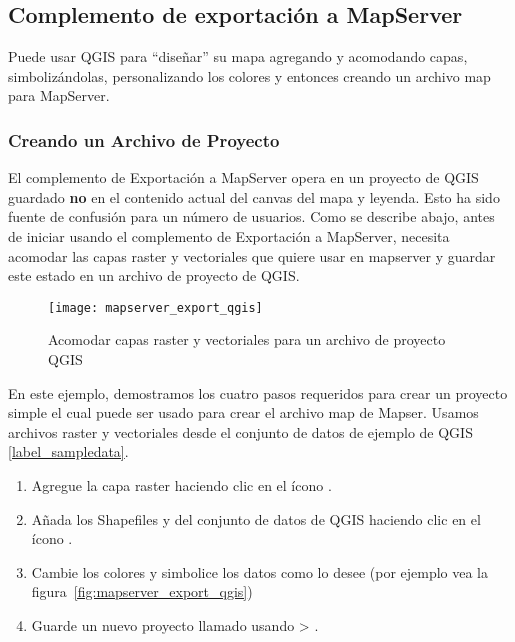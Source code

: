 
\subsection{Complemento de exportación a MapServer}\label{sec:mapserver_export}


Puede usar QGIS para ``diseñar'' su mapa agregando y acomodando capas, 
simbolizándolas, personalizando los colores y entonces creando un archivo map
para MapServer.

\subsubsection{Creando un Archivo de Proyecto}

El complemento de Exportación a MapServer opera en un proyecto de QGIS guardado  
\textbf{no} en el contenido actual del canvas del mapa y leyenda. Esto  
ha sido fuente de confusión para un número de usuarios. Como se describe abajo, 
antes de iniciar usando el complemento de Exportación a MapServer, necesita acomodar 
las capas raster y vectoriales que quiere usar en mapserver y guardar este estado
en un archivo de proyecto de QGIS.

\begin{figure}[ht]
\begin{center}
  \caption{Acomodar capas raster y vectoriales para un archivo de proyecto QGIS \nixcaption}
  \label{fig:mapserver_export_qgs}\smallskip
  \texttt{[image: mapserver\_export\_qgis]}
\end{center}
\end{figure}

En este ejemplo, demostramos los cuatro pasos requeridos para crear un proyecto
simple el cual puede ser usado para crear el archivo map de Mapser. 
Usamos archivos raster y vectoriales desde el conjunto de datos de ejemplo de QGIS \ref{label_sampledata}.

\begin{enumerate}
\item Agregue la capa raster  haciendo clic en el ícono 
.
\item Añada los Shapefiles  y 
 del conjunto de datos de QGIS haciendo clic en el ícono 
.
\item Cambie los colores y simbolice los datos como lo desee (por ejemplo vea la 
figura~\ref{fig:mapserver_export_qgis})
\item Guarde un nuevo proyecto llamado  usando 
 > .
\end{enumerate} 


